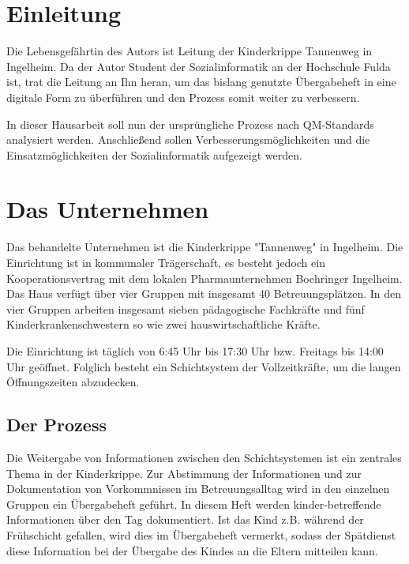 \section{Einleitung}\label{Einleitung}
Die Lebensgefährtin des Autors ist Leitung der Kinderkrippe Tannenweg in Ingelheim. Da der Autor Student der Sozialinformatik an der Hochschule Fulda ist, trat die Leitung an Ihn heran, um das bislang genutzte Übergabeheft in eine digitale Form zu überführen und den Prozess somit weiter zu verbessern.

In dieser Hausarbeit soll nun der ursprüngliche Prozess nach QM-Standards analysiert werden. Anschließend sollen Verbesserungsmöglichkeiten und die Einsatzmöglichkeiten der Sozialinformatik aufgezeigt werden.

\section{Das Unternehmen}

Das behandelte Unternehmen ist die Kinderkrippe "{}Tannenweg"{} in Ingelheim. Die Einrichtung ist in kommunaler Trägerschaft, es besteht jedoch ein Kooperationsvertrag mit dem lokalen Pharmaunternehmen Boehringer Ingelheim. Das Haus verfügt über vier Gruppen mit insgesamt 40 Betreuungsplätzen. In den vier Gruppen arbeiten insgesamt sieben pädagogische Fachkräfte und fünf Kinderkrankenschwestern so wie zwei hauswirtschaftliche Kräfte.

Die Einrichtung ist täglich von 6:45 Uhr bis 17:30 Uhr bzw. Freitags bis 14:00 Uhr geöffnet. Folglich besteht ein Schichtsystem der Vollzeitkräfte, um die langen Öffnungszeiten abzudecken.

\subsection{Der Prozess}

Die Weitergabe von Informationen zwischen den Schichtsystemen ist ein zentrales Thema in der Kinderkrippe.
Zur Abstimmung der Informationen und zur Dokumentation von Vorkommnissen im Betreuungsalltag wird in den einzelnen Gruppen ein Übergabeheft geführt. In diesem Heft werden kinder-betreffende Informationen über den Tag dokumentiert. Ist das Kind z.B. während der Frühschicht gefallen, wird dies im Übergabeheft vermerkt, sodass der Spätdienst diese Information bei der Übergabe des Kindes an die Eltern mitteilen kann.

